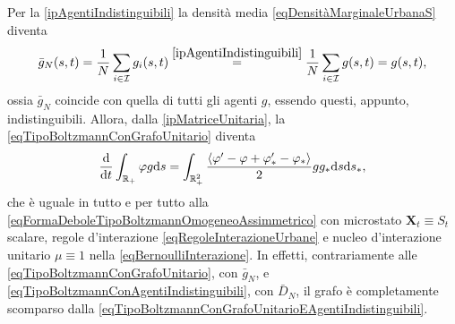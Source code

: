         Per la \ref{ipAgentiIndistinguibili} la densità media \cref{eqDensitàMarginaleUrbanaS} diventa 
        \begin{equation*}
          \bar g_N(s,t)=\frac1N\sum_{i\in\mathcal I}g_i(s,t)
          \overset{\ref{ipAgentiIndistinguibili}}=
          \frac1N\sum_{i\in\mathcal I}g(s,t)=g(s,t),
        \end{equation*}
        ossia \(\bar g_N\) coincide con quella di tutti gli agenti \(g\), essendo questi, appunto, indistinguibili. Allora, dalla \ref{ipMatriceUnitaria}, la \eqref{eqTipoBoltzmannConGrafoUnitario} diventa
        \begin{equation}
          \label{eqTipoBoltzmannConGrafoUnitarioEAgentiIndistinguibili}
          \frac{\mathrm{d}}{\mathrm{d}t}\int_{\mathbb R_+}\varphi g\mathrm{d} s=\int_{\mathbb R_+^2}
          \frac{\langle\varphi'-\varphi+\varphi'_*-\varphi_*\rangle}2
          gg_*\mathrm{d} s\mathrm{d} s_*,
        \end{equation}
        che è uguale in tutto e per tutto alla \ref{eqFormaDeboleTipoBoltzmannOmogeneoAssimmetrico} con microstato \(\mathbf X_t\equiv S_t\) scalare, regole d'interazione \ref{eqRegoleInterazioneUrbane} e nucleo d'interazione unitario \(\mu\equiv1\) nella \ref{eqBernoulliInterazione}. In effetti, contrariamente alle \cref{eqTipoBoltzmannConGrafoUnitario}, con \(\bar g_N\), e \cref{eqTipoBoltzmannConAgentiIndistinguibili}, con \(\bar D_N\), il grafo è completamente scomparso dalla \cref{eqTipoBoltzmannConGrafoUnitarioEAgentiIndistinguibili}.
